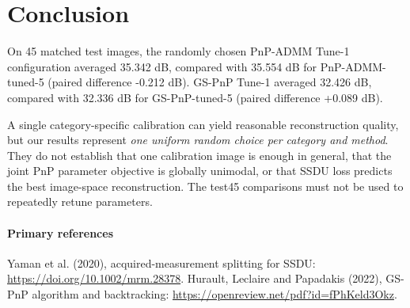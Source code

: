 \documentclass[10pt,a4paper]{article}
\begin{document}
\section{Conclusion}
On 45 matched test images, the randomly chosen PnP-ADMM Tune-1 configuration averaged 35.342 dB, compared with 35.554 dB for PnP-ADMM-tuned-5 (paired difference -0.212 dB). GS-PnP Tune-1 averaged 32.426 dB, compared with 32.336 dB for GS-PnP-tuned-5 (paired difference +0.089 dB).

A single category-specific calibration can yield reasonable
reconstruction quality, but our results represent
\emph{one uniform random choice per category and method}.
They do not establish that one calibration image is enough
in general, that the joint PnP parameter objective is
globally unimodal, or that SSDU loss predicts the best
image-space reconstruction. The test45 comparisons must not
be used to repeatedly retune parameters.

\paragraph{Primary references}
Yaman et al. (2020), acquired-measurement splitting for SSDU:
\url{https://doi.org/10.1002/mrm.28378}.
Hurault, Leclaire and Papadakis (2022),
GS-PnP algorithm and backtracking:
\url{https://openreview.net/pdf?id=fPhKeld3Okz}.

\end{document}
